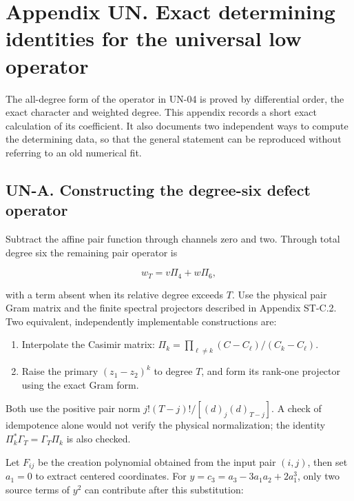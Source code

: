 \clearpage
\hypertarget{appendix-un.-exact-determining-identities-for-the-universal-low-operator}{%
\section{Appendix UN. Exact determining identities for the universal low operator}\label{appendix-un.-exact-determining-identities-for-the-universal-low-operator}}

The all-degree form of the operator in UN-04 is proved by differential order, the exact character and weighted degree. This appendix records a short exact calculation of its coefficient. It also documents two independent ways to compute the determining data, so that the general statement can be reproduced without referring to an old numerical fit.

\hypertarget{un-a.-constructing-the-degree-six-defect-operator}{%
\subsection{UN-A. Constructing the degree-six defect operator}\label{un-a.-constructing-the-degree-six-defect-operator}}

Subtract the affine pair function through channels zero and two. Through total degree six the remaining pair operator is

\[
w_T=v\Pi_4+w\Pi_6,
\]

with a term absent when its relative degree exceeds \(T\). Use the physical pair Gram matrix and the finite spectral projectors described in Appendix ST-C.2. Two equivalent, independently implementable constructions are:

\begin{enumerate}
\def\labelenumi{\arabic{enumi}.}
\tightlist
\item
  Interpolate the Casimir matrix: \(\Pi_k=\prod_{\ell\ne k}(C-C_\ell)/(C_k-C_\ell)\).
\item
  Raise the primary \((z_1-z_2)^k\) to degree \(T\), and form its rank-one projector using the exact Gram form.
\end{enumerate}

Both use the positive pair norm \(j!(T-j)!/[(d)_j(d)_{T-j}]\). A check of idempotence alone would not verify the physical normalization; the identity \(\Pi_k^*\Gamma_T=\Gamma_T\Pi_k\) is also checked.

Let \(F_{ij}\) be the creation polynomial obtained from the input pair \((i,j)\), then set \(a_1=0\) to extract centered coordinates. For \(y=c_3=a_3-3a_1a_2+2a_1^3\), only two source terms of \(y^2\) can contribute after this substitution:

